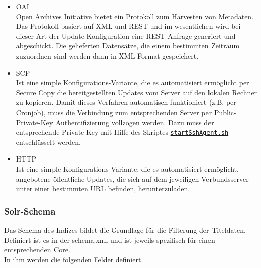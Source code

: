 \documentclass[10pt]{article}
\begin{document}
\begin{itemize}
	\item OAI \\
		Open Archives Initiative bietet ein Protokoll zum Harvesten von Metadaten. Das Protokoll basiert auf XML und REST und im wesentlichen wird bei dieser Art der Update-Konfiguration eine REST-Anfrage generiert und abgeschickt. Die gelieferten Datensätze, die einem bestimmten Zeitraum zuzuordnen sind werden dann in XML-Format gespeichert.
	\item SCP \\ 
		Ist eine simple Konfigurations-Variante, die es automatisiert ermöglicht per Secure Copy die bereitgestellten Updates vom Server auf den lokalen Rechner zu kopieren. Damit dieses Verfahren automatisch funktioniert (z.B. per Cronjob), muss die Verbindung zum entsprechenden Server per Public-Private-Key Authentifizierung vollzogen werden. Dazu muss der entsprechende Private-Key mit Hilfe des Skriptes \hyperref[sec:para:startSshAgent]{\texttt{startSshAgent.sh}} entschlüsselt werden.
	\item HTTP \\
		Ist eine simple Konfigurations-Variante, die es automatisiert ermöglicht, angebotene öffentliche Updates, die sich auf dem jeweiligen Verbundsserver unter einer bestimmten URL befinden, herunterzuladen.
\end{itemize}

\subsubsection{Solr-Schema}
Das Schema des Indizes bildet die Grundlage für die Filterung der Titeldaten. Definiert ist es in der schema.xml und ist jeweils spezifisch für einen entsprechenden Core. \\
In ihm werden die folgenden Felder definiert. 
\end{document}
